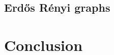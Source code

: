 \documentclass[conference]{IEEEtran}
\begin{document}
    \subsection{Erdős Rényi graphs} 



\section{Conclusion}

%
%
\end{document}
